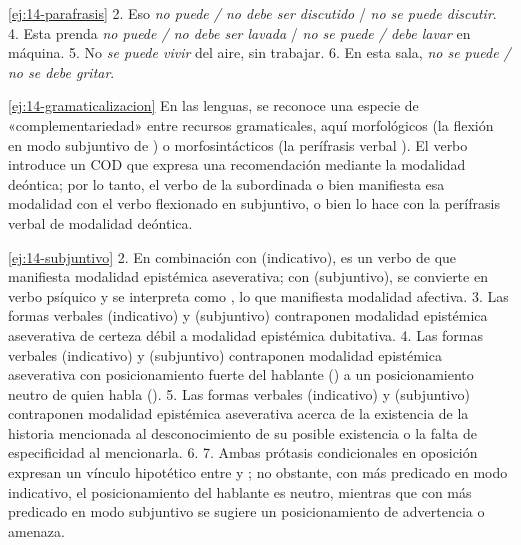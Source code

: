 \begin{solucion}{\ref{ej:14-parafrasis}}
2. Eso \textit{no puede / no debe ser discutido} / \textit{no se puede
discutir}. 4. Esta prenda \textit{no puede / no debe ser lavada} / \textit{no se
puede / debe lavar} en máquina. 5. No \textit{se puede vivir} del aire, sin
trabajar. 6. En esta sala, \textit{no se puede / no se debe
gritar}.
\end{solucion}

\begin{solucion}{\ref{ej:14-gramaticalizacion}}
En las lenguas, se reconoce una especie de «complementariedad» entre recursos
gramaticales, aquí morfológicos (la flexión en modo subjuntivo de
) o morfosintácticos (la perífrasis verbal ). El verbo  introduce un COD que expresa una recomendación
mediante la modalidad deóntica; por lo tanto, el verbo de la subordinada o bien
manifiesta esa modalidad con el verbo flexionado en subjuntivo, o bien lo hace
con la perífrasis verbal de modalidad deóntica.
\end{solucion}

\begin{solucion}{\ref{ej:14-subjuntivo}}
2. En combinación con  (indicativo),  es un verbo de
 que manifiesta modalidad epistémica aseverativa; con
 (subjuntivo),  se convierte en verbo psíquico y se
interpreta como , lo que manifiesta modalidad afectiva. 3. Las
formas verbales  (indicativo) y  (subjuntivo)
contraponen modalidad epistémica aseverativa de certeza débil a modalidad
epistémica dubitativa. 4. Las formas verbales  (indicativo) y
 (subjuntivo) contraponen modalidad epistémica aseverativa con
posicionamiento fuerte del hablante () a un posicionamiento neutro de quien habla (). 5. Las formas verbales  (indicativo) y
 (subjuntivo) contraponen modalidad epistémica aseverativa acerca de
la existencia de la historia mencionada al desconocimiento de su posible
existencia o la falta de especificidad al mencionarla. 6. 7.
Ambas prótasis condicionales en oposición expresan un vínculo hipotético entre
 y ;
no obstante, con  más predicado en modo indicativo, el posicionamiento
del hablante es neutro, mientras que con  más predicado en modo
subjuntivo se sugiere un posicionamiento de advertencia o amenaza.
\end{solucion}

